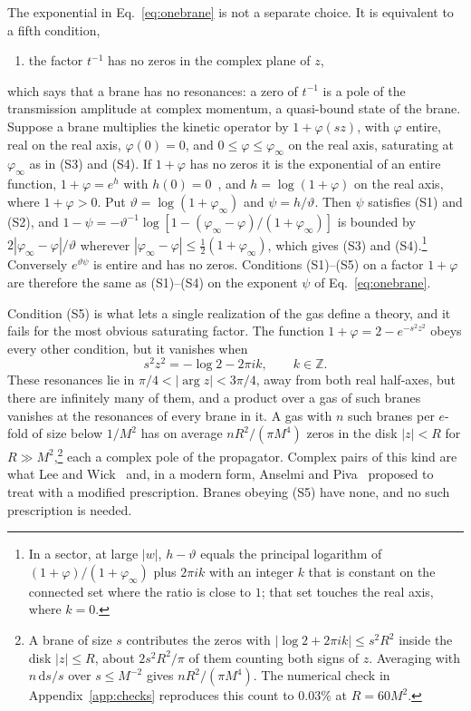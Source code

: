 \documentclass[a4paper,11pt]{article}
\newcommand{\dd}{\mathrm{d}}
\begin{document}
The exponential in Eq.~\eqref{eq:onebrane} is not a separate choice. It is equivalent to a fifth condition,
\begin{enumerate}[label=\textup{(S5)},leftmargin=2.4em,itemsep=0.15em]
\item the factor $t^{-1}$ has no zeros in the complex plane of $z$,
\end{enumerate}
which says that a brane has no resonances: a zero of $t^{-1}$ is a pole of the transmission amplitude at complex momentum, a quasi-bound state of the brane. Suppose a brane multiplies the kinetic operator by $1+\varphi(sz)$, with $\varphi$ entire, real on the real axis, $\varphi(0)=0$, and $0\le\varphi\le\varphi_\infty$ on the real axis, saturating at $\varphi_\infty$ as in (S3) and (S4). If $1+\varphi$ has no zeros it is the exponential of an entire function, $1+\varphi=e^{h}$ with $h(0)=0$~\cite{Titchmarsh1939}, and $h=\log(1+\varphi)$ on the real axis, where $1+\varphi>0$. Put $\vartheta=\log(1+\varphi_\infty)$ and $\psi=h/\vartheta$. Then $\psi$ satisfies (S1) and (S2), and $1-\psi=-\vartheta^{-1}\log[1-(\varphi_\infty-\varphi)/(1+\varphi_\infty)]$ is bounded by $2|\varphi_\infty-\varphi|/\vartheta$ wherever $|\varphi_\infty-\varphi|\le\frac12(1+\varphi_\infty)$, which gives (S3) and (S4).\footnote{In a sector, at large $|w|$, $h-\vartheta$ equals the principal logarithm of $(1+\varphi)/(1+\varphi_\infty)$ plus $2\pi i k$ with an integer $k$ that is constant on the connected set where the ratio is close to $1$; that set touches the real axis, where $k=0$.} Conversely $e^{\vartheta\psi}$ is entire and has no zeros. Conditions (S1)--(S5) on a factor $1+\varphi$ are therefore the same as (S1)--(S4) on the exponent $\psi$ of Eq.~\eqref{eq:onebrane}.

Condition (S5) is what lets a single realization of the gas define a theory, and it fails for the most obvious saturating factor. The function $1+\varphi=2-e^{-s^2z^2}$ obeys every other condition, but it vanishes when
\begin{equation}
\label{eq:qzeros}
s^2z^2=-\log2-2\pi ik,\qquad k\in\mathbb Z .
\end{equation}
These resonances lie in $\pi/4<|\arg z|<3\pi/4$, away from both real half-axes, but there are infinitely many of them, and a product over a gas of such branes vanishes at the resonances of every brane in it. A gas with $n$ such branes per $e$-fold of size below $1/M^2$ has on average $nR^2/(\pi M^4)$ zeros in the disk $|z|<R$ for $R\gg M^2$,\footnote{A brane of size $s$ contributes the zeros with $|\log2+2\pi ik|\le s^2R^2$ inside the disk $|z|\le R$, about $2s^2R^2/\pi$ of them counting both signs of $z$. Averaging with $n\,\dd s/s$ over $s\le M^{-2}$ gives $nR^2/(\pi M^4)$. The numerical check in Appendix~\ref{app:checks} reproduces this count to $0.03\%$ at $R=60M^2$.} each a complex pole of the propagator. Complex pairs of this kind are what Lee and Wick~\cite{LeeWick1969} and, in a modern form, Anselmi and Piva~\cite{Anselmi2017,AnselmiPiva2017} proposed to treat with a modified prescription. Branes obeying (S5) have none, and no such prescription is needed.
\end{document}
